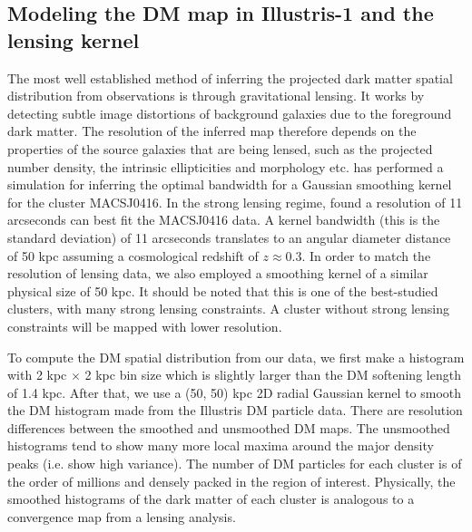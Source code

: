 \subsection{Modeling the DM map in Illustris-1 and the lensing kernel}
\label{subsec:DM_map}
The most well established method of inferring the projected dark matter spatial 
distribution from observations is through gravitational lensing.
It works by detecting subtle image distortions of background galaxies due to
the foreground dark matter. The resolution of the inferred map therefore 
depends on the properties of the source galaxies that are being lensed, 
such as the projected number density, the intrinsic ellipticities and morphology etc.
\cite{Hoag2016} has performed a simulation for inferring the optimal bandwidth
for a Gaussian smoothing kernel for the cluster MACSJ0416. 
In the strong lensing regime, \cite{Hoag2016} found a resolution of 11 arcseconds
can best fit the MACSJ0416 data. A kernel bandwidth (this is the standard deviation) 
of 11 arcseconds translates to an angular diameter distance of 50 
kpc assuming a cosmological redshift of $z \approx 0.3$. 
In order to match the resolution of lensing data,
we also employed a smoothing kernel of a similar physical size of 50 kpc.  
It should be noted that this is one of the best-studied clusters, 
with many strong lensing constraints. 
A cluster without strong lensing constraints will be mapped with 
lower resolution.

To compute the DM spatial distribution from our data, we first make a histogram with 2 kpc
$\times$ 2 kpc bin size which is slightly larger than the DM softening length of 1.4 kpc. 
After that, we use a (50, 50) kpc 2D radial Gaussian kernel 
to smooth the DM histogram made from the Illustris DM
particle data. 
There are resolution differences between the smoothed and unsmoothed DM
maps. The unsmoothed histograms tend to show many more local maxima around the major
density peaks (i.e. show high variance). 
The number of DM particles for each cluster is of 
the order of millions and densely packed in the region of
interest. 
Physically, the smoothed histograms of the dark matter of each cluster 
is analogous to a convergence map from a lensing analysis. 


